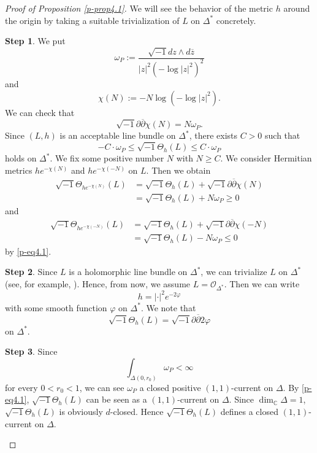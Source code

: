 \documentclass[12pt,twoside]{amsart}
\theoremstyle{definition}
\newtheorem{step}{Step}
\begin{document}
\begin{proof}[Proof of Proposition \ref{p-prop4.1}]
We will see the behavior of the metric $h$ around 
the origin by taking a suitable trivialization of $L$ on $\Delta^*$ concretely. 
\begin{step}\label{p-step4.1-1}
We put 
\[
\omega_P:=\frac{\sqrt{-1}dz\wedge d\overline z}{|z|^2(-\log|z|^2)^2}
\] 
and 
\[
\chi (N):=-N\log \left(-\log |z|^2\right). 
\] 
We can check that 
\[ 
\sqrt{-1}\partial \overline \partial \chi (N)=N\omega_P. 
\] 
Since $(L, h)$ is an acceptable line bundle on $\Delta^*$, 
there exists $C>0$ such that 
\begin{equation}\label{p-eq4.1}
-C\cdot \omega_P\leq \sqrt{-1}\Theta_h(L)\leq C\cdot \omega_P 
\end{equation} 
holds on $\Delta^*$. 
We fix some positive number $N$ with $N\geq C$. 
We consider Hermitian metrics $he^{-\chi(N)}$ and 
$he^{-\chi(-N)}$ on $L$. 
Then we obtain 
\[ 
\begin{split}
\sqrt{-1}\Theta_{he^{-\chi(N)}}(L)&=
\sqrt{-1}\Theta_h(L)+\sqrt{-1}\partial \overline\partial \chi (N)
\\ &=\sqrt{-1}\Theta_h(L)+N\omega_P\geq 0 
\end{split} 
\] and 
\[ 
\begin{split}
\sqrt{-1}\Theta_{he^{-\chi(-N)}}(L)&=
\sqrt{-1}\Theta_h(L)+\sqrt{-1}\partial \overline\partial \chi (-N)
\\ &=\sqrt{-1}\Theta_h(L)-N\omega_P\leq 0  
\end{split} 
\] 
by \eqref{p-eq4.1}. 
\end{step}
\begin{step}\label{p-step4.1-2}
Since $L$ is a holomorphic line bundle on $\Delta^*$, 
we can trivialize $L$ on $\Delta^*$ (see, for example, \cite[30.3.~Theorem]{forster}).  
Hence, from now,  
we assume $L=\mathcal O_{\Delta^*}$. 
Then we can write 
\[
h=|\cdot|^2e^{-2\varphi}
\]
with some smooth function $\varphi$ on $\Delta^*$. 
We note that 
\[
\sqrt{-1}\Theta_h(L)=\sqrt{-1}\partial \overline \partial 2\varphi 
\] 
on $\Delta^*$. 
\end{step}
\begin{step}\label{p-step4.1-3}
Since 
\[
\int _{\Delta(0, r_0)}\omega_P<\infty
\] 
for every $0<r_0<1$, 
we can see $\omega_P$ a closed positive $(1, 1)$-current on $\Delta$. 
By \eqref{p-eq4.1}, $\sqrt{-1}\Theta_h(L)$ can be seen as a 
$(1, 1)$-current on $\Delta$. Since $\dim_{\mathbb C} \Delta=1$, 
$\sqrt{-1}\Theta_h(L)$ is obviously 
$d$-closed. 
Hence $\sqrt{-1}\Theta_h(L)$ defines a closed $(1, 1)$-current on $\Delta$. 

\end{step}
\end{proof}
\end{document}

